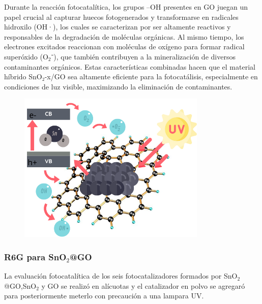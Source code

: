 \documentclass[12pt]{article}
\begin{document}
Durante la reacción fotocatalítica, los grupos –OH presentes en GO juegan un papel crucial al capturar huecos fotogenerados y transformarse en radicales hidroxilo (OH·), los cuales se caracterizan por ser altamente reactivos y responsables de la degradación de moléculas orgánicas. Al mismo tiempo, los electrones excitados reaccionan con moléculas de oxígeno para formar radical superóxido (O$\displaystyle _{2}$⁻), que también contribuyen a la mineralización de diversos contaminantes orgánicos. Estas características combinadas hacen que el material híbrido SnO₂-x/GO sea altamente eficiente para la fotocatálisis, especialmente en condiciones de luz visible, maximizando la eliminación de contaminantes.
        \begin{figure}[H]
    	   \begin{center}
     	  	\includegraphics[width = 0.8\textwidth]{Imagenes/Fotocatalisis_SnO2.png}
    	   \end{center} 
        \end{figure}
\subsubsection{R6G para SnO$\displaystyle _{2}$@GO}
        
La evaluación fotocatalítica de los seis fotocatalizadores formados por SnO$\displaystyle _{2}$@GO,SnO$\displaystyle _{2}$ y GO se realizó en alícuotas y el catalizador en polvo se agregaró para posteriormente meterlo con precaución a una lampara UV.\vspace{1em} %
\end{document}
